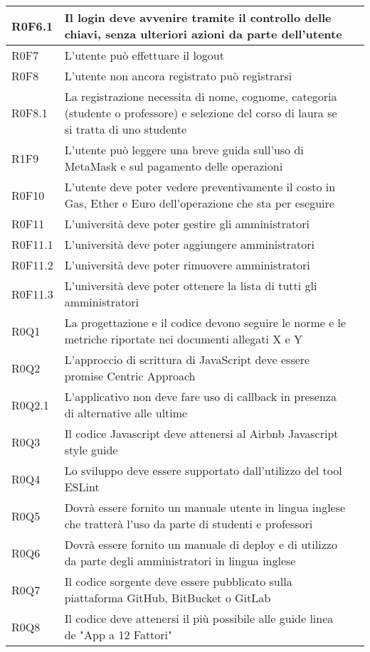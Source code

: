 \documentclass[AnalisiDeiRequisiti.tex]{subfiles}
\begin{document}
\begin{longtable}[H]{|p{2cm}|p{5cm}|p{5cm}|}
	R0F6.1 &  Il login deve avvenire tramite il controllo delle chiavi, senza ulteriori azioni da parte dell'utente &  \\ \hline
	R0F7 &  L'utente può effettuare il logout &  \\ \hline
	R0F8 &  L'utente non ancora registrato può registrarsi &  \\ \hline
	R0F8.1 &  La registrazione necessita di nome, cognome, categoria (studente o professore) e selezione del corso di laura se si tratta di uno studente &  \\ \hline
	R1F9 &  L'utente può leggere una breve guida sull'uso di MetaMask e sul pagamento delle operazioni &  \\ \hline
	R0F10 &  L'utente deve poter vedere preventivamente il costo in Gas, Ether e Euro dell'operazione che sta per eseguire &  \\ \hline
	R0F11 &  L'università deve poter gestire gli amministratori &  \\ \hline
	R0F11.1 &  L'università deve poter aggiungere amministratori &  \\ \hline
	R0F11.2 &  L'università deve poter rimuovere amministratori &  \\ \hline
	R0F11.3 &  L'università deve poter ottenere la lista di tutti gli amministratori &  \\ \hline
	R0Q1 &  La progettazione e il codice devono seguire le norme e le metriche riportate nei documenti allegati X e Y &  \\ \hline
	R0Q2 &  L'approccio di scrittura di JavaScript deve essere promise Centric Approach &  \\ \hline
	R0Q2.1 &  L'applicativo non deve fare uso di callback in presenza di alternative alle ultime &  \\ \hline
	R0Q3 &  Il codice Javascript deve attenersi al Airbnb Javascript style guide &  \\ \hline
	R0Q4 &  Lo sviluppo deve essere supportato dall'utilizzo del tool ESLint &  \\ \hline
	R0Q5 &  Dovrà essere fornito un manuale utente in lingua inglese che tratterà l'uso da parte di studenti e professori &  \\ \hline
	R0Q6 &  Dovrà essere fornito un manuale di deploy e di utilizzo da parte degli amministratori in lingua inglese &  \\ \hline
	R0Q7 &  Il codice sorgente deve essere pubblicato sulla piattaforma GitHub, BitBucket o GitLab &  \\ \hline
	R0Q8 &  Il codice deve attenersi il più possibile alle guide linea de "App a 12 Fattori" &  \\ \hline

\end{longtable}
\end{document}

